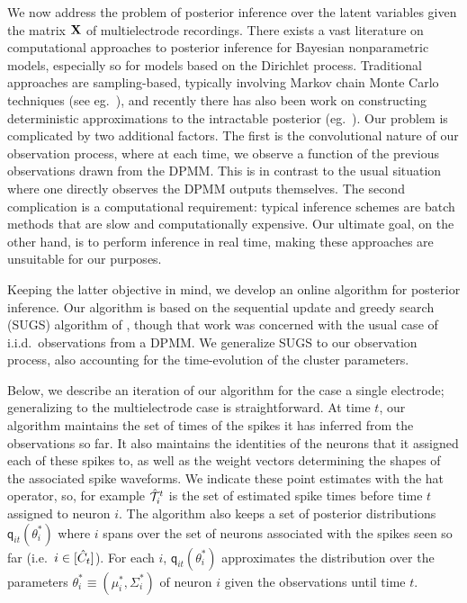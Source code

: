 \newcommand{\tx}{\tilde{x}}
\newcommand{\resx}{\delta{\bx}^L}


We now address the problem of posterior inference over the latent variables given the matrix $\mathbf{X}$ of multielectrode recordings. 
There exists a vast literature on computational approaches to posterior inference for Bayesian nonparametric models, especially so for models based on the 
Dirichlet process.
Traditional approaches are sampling-based, typically involving Markov chain Monte Carlo techniques (see eg.\ \citep{Nea2000, IshJam2001}), 
and recently there has also been work on constructing deterministic approximations to the intractable posterior (eg.\ \citep{BleJor2006, MinGha2003}).
Our problem is complicated by two additional factors. The first is the convolutional nature of our observation process, 
where at each time,
we observe a function of the previous observations drawn from the DPMM. This is in contrast to the usual situation where one directly observes 
the DPMM outputs themselves.
The second complication is a computational requirement: typical inference schemes are batch methods that are slow and computationally expensive. 
Our ultimate goal, on the other hand, is to perform inference in real time, making these approaches are unsuitable for our purposes.

Keeping the latter objective in mind, we develop an online algorithm for posterior inference. Our algorithm is based on the sequential update and
greedy search (SUGS) algorithm of
\citep{WangDun2009}, though that work was concerned with the usual case of i.i.d.\ observations from a DPMM. We generalize SUGS to our 
observation process, also accounting for the time-evolution of the cluster parameters.

Below, we describe an iteration of our algorithm for the case a single electrode; %
generalizing to the multielectrode case is straightforward. 
At time $t$, our algorithm maintains the set of times of the spikes it has inferred from the observations so far. It also maintains
the identities of the neurons that it assigned each of these spikes to, as well as the weight vectors determining the shapes of the associated spike 
waveforms. We indicate these point estimates with the hat operator, so, for example $\hat{\mathcal{T}}^t_i$ is the set of estimated spike times before time $t$ assigned
to neuron $i$. The algorithm also keeps a set of posterior distributions $\mathsf{q}_{it}(\theta^*_i)$ where $i$ spans over the
set of neurons associated with the spikes seen so far (i.e.\ $i \in [\hat{C}_t]$). 
For each $i$, $\mathsf{q}_{it}(\theta^*_i)$ approximates the distribution over the parameters 
$\theta_i^* \equiv (\mu_i^*, \Sigma_i^*)$ of neuron $i$ given the observations until time $t$. 

